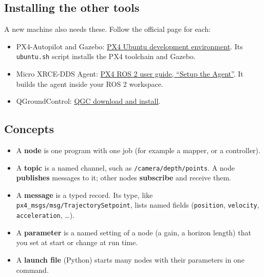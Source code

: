 \documentclass[11pt,a4paper]{article}
\begin{document}
\subsection{Installing the other tools}\label{installing-the-other-tools}

A new machine also needs these. Follow the official page for each:

\begin{itemize}
	\item
	      PX4-Autopilot and Gazebo:
	      \href{https://docs.px4.io/main/en/dev_setup/dev_env_linux_ubuntu.html}{PX4
		      Ubuntu development environment}. Its \texttt{ubuntu.sh} script installs
	      the PX4 toolchain and Gazebo.
	\item
	      Micro XRCE-DDS Agent:
	      \href{https://docs.px4.io/main/en/ros2/user_guide.html\#setup-the-agent}{PX4
		      ROS 2 user guide, ``Setup the Agent''}. It builds the agent inside your
	      ROS 2 workspace.
	\item
	      QGroundControl:
	      \href{https://docs.qgroundcontrol.com/master/en/qgc-user-guide/getting_started/download_and_install.html}{QGC
		      download and install}.
\end{itemize}

\subsection{Concepts}\label{concepts}

\begin{itemize}
	\item
	      A \textbf{node} is one program with one job (for example a mapper, or
	      a controller).
	\item
	      A \textbf{topic} is a named channel, such as
	      \texttt{/camera/depth/points}. A node \textbf{publishes} messages to
	      it; other nodes \textbf{subscribe} and receive them.
	\item
	      A \textbf{message} is a typed record. Its type, like
	      \texttt{px4\_msgs/msg/TrajectorySetpoint}, lists named fields
	      (\texttt{position}, \texttt{velocity}, \texttt{acceleration}, \ldots).
	\item
	      A \textbf{parameter} is a named setting of a node (a gain, a horizon
	      length) that you set at start or change at run time.
	\item
	      A \textbf{launch file} (Python) starts many nodes with their
	      parameters in one command.
\end{itemize}
\end{document}
